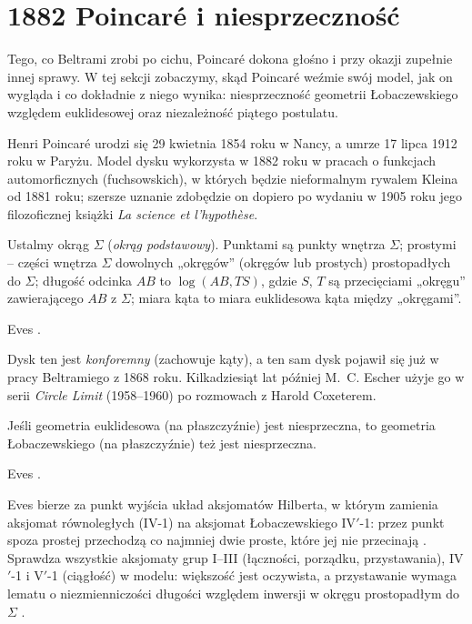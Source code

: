 \section{1882 Poincaré i niesprzeczność} %
\label{sekcja_poincare}

Tego, co Beltrami zrobi po cichu, Poincaré dokona głośno i przy okazji zupełnie innej sprawy. %
W tej sekcji zobaczymy, skąd Poincaré weźmie swój model, jak on wygląda i co dokładnie z niego wynika: niesprzeczność geometrii Łobaczewskiego względem euklidesowej oraz niezależność piątego postulatu. %

Henri Poincaré urodzi się 29 kwietnia 1854 roku w Nancy, a umrze 17 lipca 1912 roku w Paryżu. %
Model dysku wykorzysta w 1882 roku w pracach o funkcjach automorficznych (fuchsowskich), w których będzie nieformalnym rywalem Kleina od 1881 roku; szersze uznanie zdobędzie on dopiero po wydaniu w 1905 roku jego filozoficznej książki \emph{La science et l'hypothèse}. %
%

\begin{definition}
	Ustalmy okrąg $\Sigma$ (\emph{okrąg podstawowy}). %
	Punktami są punkty wnętrza $\Sigma$; prostymi -- części wnętrza $\Sigma$ dowolnych „okręgów'' (okręgów lub prostych) prostopadłych do $\Sigma$; długość odcinka $AB$ to $\log(AB, TS)$, gdzie $S$, $T$ są przecięciami „okręgu'' zawierającego $AB$ z $\Sigma$; miara kąta to miara euklidesowa kąta między „okręgami''. %
\end{definition}

Eves \cite[s. 347--348]{eves1_1972}. %

Dysk ten jest \emph{konforemny} (zachowuje kąty), a ten sam dysk pojawił się już w pracy Beltramiego z 1868 roku. %
Kilkadziesiąt lat później M.~C. Escher użyje go w serii \emph{Circle Limit} (1958--1960) po rozmowach z Harold Coxeterem. %
%
%

\begin{proposition}
	Jeśli geometria euklidesowa (na płaszczyźnie) jest niesprzeczna, to geometria Łobaczewskiego (na płaszczyźnie) też jest niesprzeczna. %
\end{proposition}

Eves \cite[s. 347-353]{eves1_1972}. %

Eves bierze za punkt wyjścia układ aksjomatów Hilberta, w którym zamienia aksjomat równoległych (IV-1) na aksjomat Łobaczewskiego IV$'$-1: przez punkt spoza prostej przechodzą co najmniej dwie proste, które jej nie przecinają \cite[s. 347]{eves1_1972}. %
Sprawdza wszystkie aksjomaty grup I--III (łączności, porządku, przystawania), IV$'$-1 i V$'$-1 (ciągłość) w modelu: większość jest oczywista, a przystawanie wymaga lematu o niezmienniczości długości względem inwersji w okręgu prostopadłym do $\Sigma$ \cite[s. 348--352]{eves1_1972}. %


